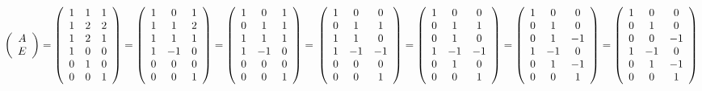 \documentclass[UTF8, 12pt]{ctexart}
\begin{document}
$\left(\begin{array}{c}
    A \\
    E
\end{array}\right)=\left(\begin{array}{ccc}
    1 & 1 & 1 \\
    1 & 2 & 2 \\
    1 & 2 & 1 \\
    1 & 0 & 0 \\
    0 & 1 & 0 \\
    0 & 0 & 1
\end{array}\right)=\left(\begin{array}{ccc}
    1 & 0 & 1 \\
    1 & 1 & 2 \\
    1 & 1 & 1 \\
    1 & -1 & 0 \\
    0 & 0 & 0 \\
    0 & 0 & 1
\end{array}\right)=\left(\begin{array}{ccc}
    1 & 0 & 1 \\
    0 & 1 & 1 \\
    1 & 1 & 1 \\
    1 & -1 & 0 \\
    0 & 0 & 0 \\
    0 & 0 & 1
\end{array}\right)=\\\left(\begin{array}{ccc}
    1 & 0 & 0 \\
    0 & 1 & 1 \\
    1 & 1 & 0 \\
    1 & -1 & -1 \\
    0 & 0 & 0 \\
    0 & 0 & 1
\end{array}\right)=\left(\begin{array}{ccc}
    1 & 0 & 0 \\
    0 & 1 & 1 \\
    0 & 1 & 0 \\
    1 & -1 & -1 \\
    0 & 1 & 0 \\
    0 & 0 & 1
\end{array}\right)=\left(\begin{array}{ccc}
    1 & 0 & 0 \\
    0 & 1 & 0 \\
    0 & 1 & -1 \\
    1 & -1 & 0 \\
    0 & 1 & -1 \\
    0 & 0 & 1
\end{array}\right)=\left(\begin{array}{ccc}
    1 & 0 & 0 \\
    0 & 1 & 0 \\
    0 & 0 & -1 \\
    1 & -1 & 0 \\
    0 & 1 & -1 \\
    0 & 0 & 1
\end{array}\right)$
\end{document}

